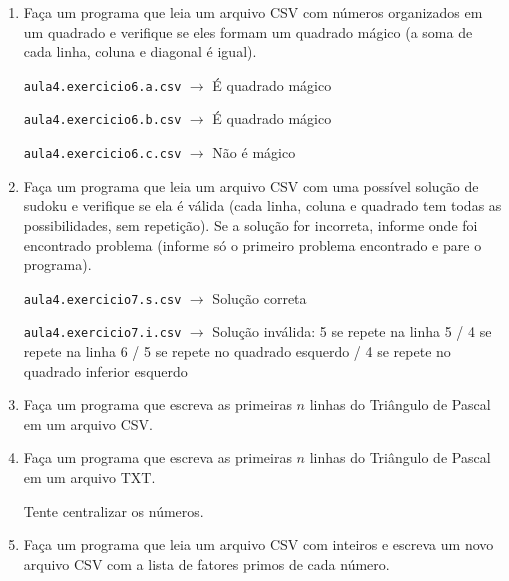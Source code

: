 \begin{enumerate}
		
		
		\texttt{aula4.exercicio5.v.csv}
		$\rightarrow$
		Deu velha
		
		\texttt{aula4.exercicio5.x.csv}
		$\rightarrow$
		X venceu	
	
		\texttt{aula4.exercicio5.o.csv}
		$\rightarrow$
		O venceu
		
		\texttt{aula4.exercicio5.i.csv} 
		$\rightarrow$ 
		Inválido: O jogou mais que X
		
	\item Faça um programa que leia um arquivo CSV com números organizados em um quadrado e verifique se eles formam um quadrado mágico (a soma de cada linha, coluna e diagonal é igual).
	
		\texttt{aula4.exercicio6.a.csv}
		$\rightarrow$
		É quadrado mágico
		
		\texttt{aula4.exercicio6.b.csv}
		$\rightarrow$
		É quadrado mágico	
		
		\texttt{aula4.exercicio6.c.csv}
		$\rightarrow$
		Não é mágico
		
\quebra		
	
	\item Faça um programa que leia um arquivo CSV com uma possível solução de sudoku e verifique se ela é válida (cada linha, coluna e quadrado tem todas as possibilidades, sem repetição).
	Se a solução for incorreta, informe onde foi encontrado problema (informe só o primeiro problema encontrado e pare o programa).
	
		\texttt{aula4.exercicio7.s.csv}
		$\rightarrow$
		Solução correta
		
		\texttt{aula4.exercicio7.i.csv}
		$\rightarrow$
		Solução inválida: 
		5 se repete na linha 5 /
		4 se repete na linha 6 /
		5 se repete no quadrado esquerdo /
		4 se repete no quadrado inferior esquerdo 
		
		
	
		
\quebra	

	\item Faça um programa que escreva as primeiras $n$ linhas do Triângulo de Pascal em um arquivo CSV.
	
	\item Faça um programa que escreva as primeiras $n$ linhas do Triângulo de Pascal em um arquivo TXT.
	
	Tente centralizar os números.

\quebra	

	\item Faça um programa que leia um arquivo CSV com inteiros e escreva um novo arquivo CSV com a lista de fatores primos de cada número.
	

\end{enumerate}
